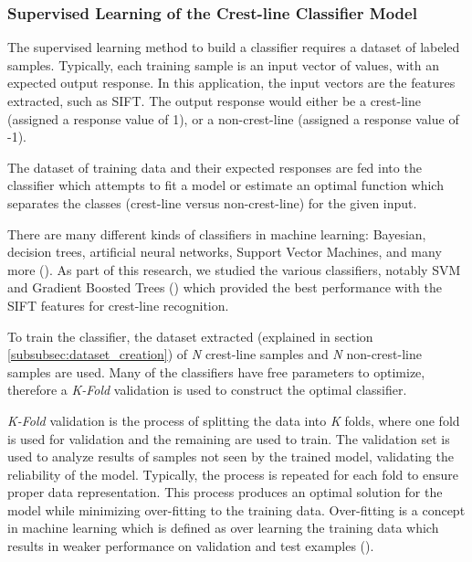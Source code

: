\subsubsection{Supervised Learning of the Crest-line Classifier Model} \label{subsubsec:supervised_learning_classifiers}

The supervised learning method to build a classifier requires a dataset of labeled samples. Typically, each training sample is an input vector of values, with an expected output response. In this application, the input vectors are the features extracted, such as SIFT. The output response would either be a crest-line (assigned a response value of 1), or a non-crest-line (assigned a response value of -1).

The dataset of training data and their expected responses are fed into the classifier which attempts to fit a model or estimate an optimal function which separates the classes (crest-line versus non-crest-line) for the given input.

There are many different kinds of classifiers in machine learning: Bayesian, decision trees, artificial neural networks, Support Vector Machines, and many more (\cite{book_artificial_intelligence_modern_approach,2003_tackling_poor_assumptions_naive_bayes,1987_simplifying_decision_trees,1943_logical_calculus_ideas_immanent_nervous_activity,book_organization_of_behavior,1975_beyond_regression_prediction_analysis,1995_support_vector_networks,1995_support_vector_clustering}). As part of this research, we studied the various classifiers, notably SVM and Gradient Boosted Trees (\cite{1999_gradient_boosting_machine,1999_stochastic_gradient_boosting}) which provided the best performance with the SIFT features for crest-line recognition.

To train the classifier, the dataset extracted (explained in section \ref{subsubsec:dataset_creation}) of \emph{N} crest-line samples and \emph{N} non-crest-line samples are used. Many of the classifiers have free parameters to optimize, therefore a \emph{K-Fold} validation is used to construct the optimal classifier. 

\emph{K-Fold} validation is the process of splitting the data into \emph{K} folds, where one fold is used for validation and the remaining are used to train. The validation set is used to analyze results of samples not seen by the trained model, validating the reliability of the model. Typically, the process is repeated for each fold to ensure proper data representation. This process produces an optimal solution for the model while minimizing over-fitting to the training data. Over-fitting is a concept in machine learning which is defined as over learning the training data which results in weaker performance on validation and test examples (\cite{the-problem-of-overfitting,neural-network-studies-overfitting-overtraining,over-fitting-model-selection-bias}).

